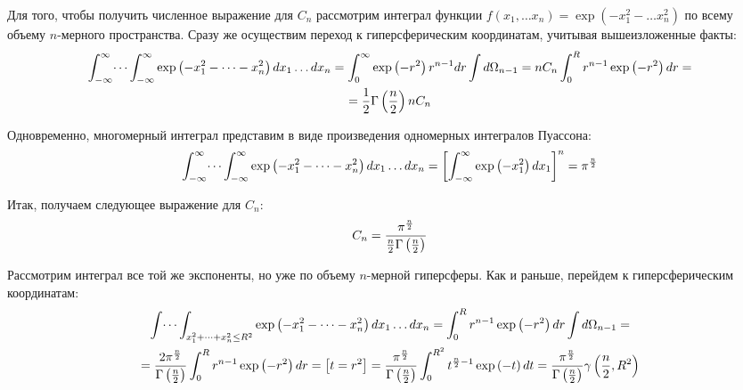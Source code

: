 \documentclass[14pt]{article}
\newcommand{\lb}{\left(}
\newcommand{\rb}{\right)}
\begin{document}
Для того, чтобы получить численное выражение для $C_n$ рассмотрим интеграл функции $f(x_1, \dots x_n) = \exp \lb -x_1^2 - \dots x_n^2 \rb$ по всему объему $n$-мерного пространства. Сразу же осуществим переход к гиперсферическим координатам, учитывая вышеизложенные факты:
\begin{gather}
	\int_{-\infty}^{\infty} \dots \int_{-\infty}^{\infty} \exp \lb -x_1^2 - \dots -x_n^2 \rb dx_1 \dots dx_n = \int_{0}^{\infty} \exp \lb -r^2 \rb r^{n-1} dr \int d \Omega_{n-1}  = n C_n \int_{0}^{R} r^{n-1} \exp \lb -r^2 \rb dr= \notag \\
	= \frac{1}{2} \Gamma \lb \frac{n}{2} \rb n C_n \notag
\end{gather}

Одновременно, многомерный интеграл представим в виде произведения одномерных интегралов Пуассона:
\begin{gather}
	\int_{-\infty}^{\infty} \dots \int_{-\infty}^{\infty} \exp \lb -x_1^2 - \dots - x_n^2 \rb d x_1 \dots dx_n = \left[ \int_{-\infty}^{\infty} \exp \lb -x_1^2 \rb dx_1 \right]^n  = \pi^\frac{n}{2} \notag 
\end{gather}

Итак, получаем следующее выражение для $C_n$:
\begin{gather}
	C_n = \frac{\pi^\frac{n}{2}}{\frac{n}{2} \Gamma \lb \frac{n}{2} \rb} \notag
\end{gather}

Рассмотрим интеграл все той же экспоненты, но уже по объему $n$-мерной гиперсферы. Как и раньше, перейдем к гиперсферическим координатам:
\begin{gather}
	\int \dots \int_{x_1^2 + \dots + x_n^2 \leq R^2} \exp \lb -x_1^2 - \dots - x_n^2 \rb dx_1 \dots dx_n = \int_{0}^{R} r^{n-1} \exp \lb -r^2 \rb dr \int d \Omega_{n-1} = \notag \\
	= \frac{2 \pi^{\frac{n}{2}}}{\Gamma \lb \frac{n}{2} \rb} \int_{0}^{R} r^{n-1} \exp \lb -r^2 \rb dr = \left[ t = r^2 \right] = \frac{\pi^{\frac{n}{2}}}{\Gamma \lb \frac{n}{2} \rb} \int_{0}^{R^2} t^{\frac{n}{2} - 1} \exp \lb -t \rb dt = \frac{\pi^{\frac{n}{2}}}{\Gamma \lb \frac{n}{2} \rb} \gamma \lb \frac{n}{2}, R^2 \rb \notag
\end{gather}
\end{document}
